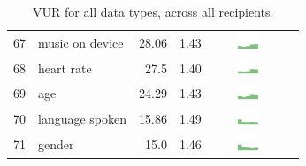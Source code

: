 \begin{table}[t]
\begin{center}
\begin{tabular}{| r | l | r | r | r | r |}
67 & music on device & 28.06 & 1.43 & \includegraphics[width = 2cm, height = 0.5cm]{tex-inputs/table-images/copiedanduploadedmusicfromyourdevicecombined} \\ 
68 & heart rate & 27.5 & 1.40 & \includegraphics[width = 2cm, height = 0.5cm]{tex-inputs/table-images/learnedyourheartratecombined} \\ 
69 & age & 24.29 & 1.43 &  \includegraphics[width = 2cm, height = 0.5cm]{tex-inputs/table-images/learnedyouragecombined} \\ 
70 & language spoken & 15.86 & 1.49 & \includegraphics[width = 2cm, height = 0.5cm]{tex-inputs/table-images/learnedthelanguageyouwerespeakingcombined} \\ 
71 & gender & 15.0 & 1.46 &  \includegraphics[width = 2cm, height = 0.5cm]{tex-inputs/table-images/learnedyourgendercombined} \\ 
\hline
\end{tabular}
\caption{VUR for all data types, across all recipients.}
\end{center}
\end{table}
